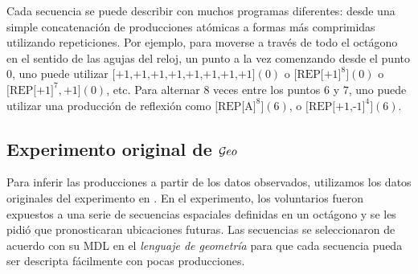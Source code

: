 Cada secuencia se puede describir con muchos programas diferentes: desde una simple concatenación de producciones atómicas a formas más comprimidas utilizando repeticiones. Por ejemplo, para moverse a través de todo el octágono en el sentido de las agujas del reloj, un punto a la vez comenzando desde el punto $0$, uno puede utilizar $\textrm{[+1,+1,+1,+1,+1,+1,+1,+1]}(0)$ o $\textrm{[REP[+1]}^8](0)$ o $\textrm{[REP[+1]}^7,\textrm{+1]}(0)$, etc. Para alternar $8$ veces entre los puntos $6$ y $7$, uno puede utilizar una producción de reflexión como $\textrm{[REP[A]}^8](6)$, o $\textrm{[REP[+1,-1]}^4](6)$.

\subsection{Experimento original de $\mathcal Geo$}


Para inferir las producciones a partir de los datos observados, utilizamos los datos originales del experimento en \cite{marie2016}. En el experimento, los voluntarios fueron expuestos a una serie de secuencias espaciales definidas en un octágono y se les pidió que pronosticaran ubicaciones futuras. Las secuencias se seleccionaron de acuerdo con su MDL en el \textit{lenguaje de geometría} para que cada secuencia pueda ser descripta fácilmente con pocas producciones.


